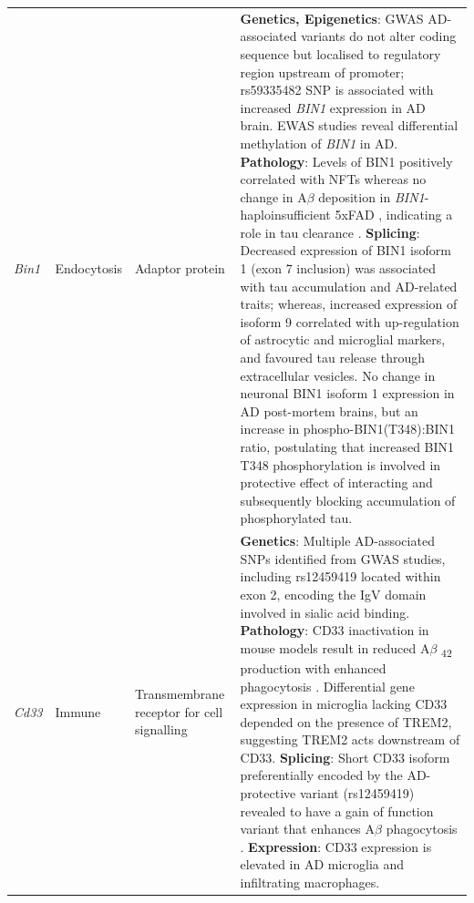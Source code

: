 \begin{landscape}
\begin{longtable}[c]{p{1cm}p{2cm}p{4cm}p{19cm}}
			\centering \textit{Bin1} &
			\centering Endocytosis  &
			\centering Adaptor protein &
			\tabitem \textbf{Genetics, Epigenetics}: GWAS AD-associated variants do not alter coding sequence but localised to regulatory region upstream of promoter; rs59335482 SNP is associated with increased \textit{BIN1} expression in AD brain\cite{Chapuis2013}. \newline
			\tabitem EWAS studies reveal differential methylation of \textit{BIN1} in AD.  \newline
			\tabitem \textbf{Pathology}: Levels of BIN1 positively correlated with NFTs whereas no change in A$\beta$ deposition in \textit{BIN1}-haploinsufficient 5xFAD \cite{Andrew2019}, indicating a role in tau clearance \cite{Crotti2019}.\newline 
			\tabitem \textbf{Splicing}: Decreased expression of BIN1 isoform 1 (exon 7 inclusion) was associated with tau accumulation and AD-related traits\cite{Taga2020}; whereas, increased expression of isoform 9 correlated with up-regulation of astrocytic and microglial markers\cite{Taga2020}, and favoured tau release through extracellular vesicles\cite{Crotti2019}. \newline
			\tabitem No change in neuronal BIN1 isoform 1 expression in AD post-mortem brains, but an increase in phospho-BIN1(T348):BIN1 ratio, postulating that increased BIN1 T348 phosphorylation is involved in protective effect of interacting and subsequently blocking accumulation of phosphorylated tau\cite{Sartori2019}. \\
			
			\centering \textit{Cd33} &
			\centering Immune  &
			\centering Transmembrane receptor for cell signalling &
			\tabitem \textbf{Genetics}: Multiple AD-associated SNPs identified from GWAS studies, including  rs12459419\cite{Naj2011,Hollingworth2011,Bertram2008} located within exon 2, encoding the IgV domain involved in sialic acid binding\cite{Malik2013}. \newline
			\tabitem \textbf{Pathology}: CD33 inactivation in mouse models result in reduced A$\beta$ \textsubscript{42} production with enhanced phagocytosis \cite{Griciuc2013}. Differential gene expression in microglia lacking CD33 depended on the presence of TREM2, suggesting TREM2 acts downstream of CD33\cite{Griciuc2019}. \newline			
			\tabitem \textbf{Splicing}: Short CD33 isoform preferentially encoded by the AD-protective variant (rs12459419) revealed to have a gain of function variant that enhances A$\beta$ phagocytosis \cite{Bhattacherjee2021}.\newline		
			\tabitem \textbf{Expression}: CD33 expression is elevated in AD microglia and infiltrating macrophages\cite{Griciuc2013}. \\
			

\end{longtable}
\end{landscape}
